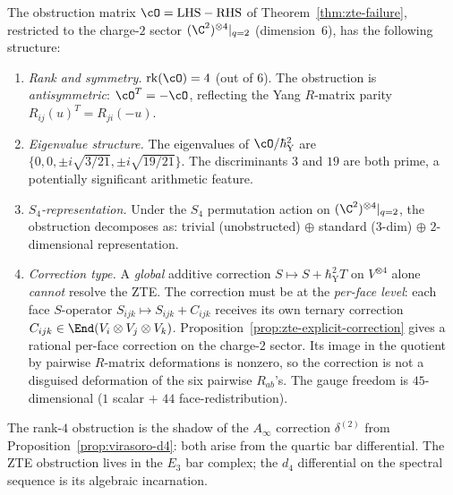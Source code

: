 \begin{remark}
\label{rem:zte-obstruction-structure}
The obstruction matrix $\cO = \mathrm{LHS} - \mathrm{RHS}$ of Theorem~\ref{thm:zte-failure}, restricted to the charge-$2$ sector $(\C^2)^{\otimes 4}|_{q=2}$ (dimension~$6$), has the following structure:
\begin{enumerate}[label=\textup{(\roman*)}]
 \item \emph{Rank and symmetry.} $\mathrm{rk}(\cO) = 4$ (out of $6$). The obstruction is \emph{antisymmetric}: $\cO^T = -\cO$, reflecting the Yang $R$-matrix parity $R_{ij}(u)^T = R_{ji}(-u)$.
 \item \emph{Eigenvalue structure.} The eigenvalues of $\cO / \hbar_{\mathrm{Y}}^2$ are $\{0, 0, \pm i\sqrt{3/21}, \pm i\sqrt{19/21}\}$. The discriminants $3$ and $19$ are both prime, a potentially significant arithmetic feature.
 \item \emph{$S_4$-representation.} Under the $S_4$ permutation action on $(\C^2)^{\otimes 4}|_{q=2}$, the obstruction decomposes as: trivial (unobstructed) $\oplus$ standard ($3$-dim) $\oplus$ $2$-dimensional representation.
 \item \emph{Correction type.} A \emph{global} additive correction $S \mapsto S + \hbar_{\mathrm{Y}}^2 T$ on $V^{\otimes 4}$ alone \emph{cannot} resolve the ZTE. The correction must be at the \emph{per-face level}: each face $S$-operator $S_{ijk} \mapsto S_{ijk} + C_{ijk}$ receives its own ternary correction $C_{ijk} \in \End(V_i \otimes V_j \otimes V_k)$. Proposition~\ref{prop:zte-explicit-correction} gives a rational per-face correction on the charge-$2$ sector. Its image in the quotient by pairwise $R$-matrix deformations is nonzero, so the correction is not a disguised deformation of the six pairwise $R_{ab}$'s. The gauge freedom is $45$-dimensional ($1$ scalar $+$ $44$ face-redistribution).
\end{enumerate}
The rank-$4$ obstruction is the shadow of the $A_\infty$ correction $\delta^{(2)}$ from Proposition~\ref{prop:virasoro-d4}: both arise from the quartic bar differential. The ZTE obstruction lives in the $E_3$ bar complex; the $d_4$ differential on the spectral sequence is its algebraic incarnation.
\end{remark}

